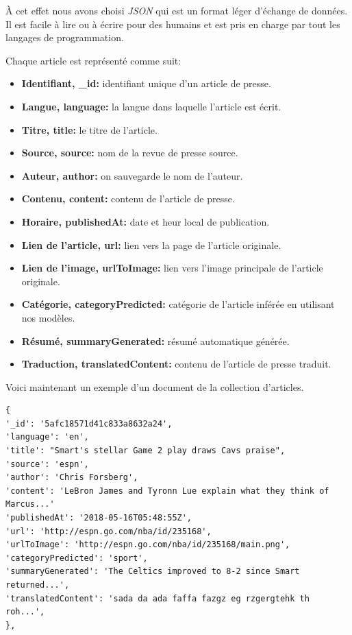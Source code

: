 À cet effet nous avons choisi \emph{JSON} qui est un format léger d'échange de données. Il est facile à lire ou à écrire pour des humains\cite{json} et est pris en charge par tout les langages de programmation.

Chaque article est représenté comme suit:
\begin{itemize}
    \item \textbf{Identifiant, \textquotedbl \_id\textquotedbl: } identifiant unique d'un article de presse.
    \item \textbf{Langue, \textquotedbl language\textquotedbl:} la langue dans laquelle l'article est écrit.
    \item \textbf{Titre, \textquotedbl title\textquotedbl:} le titre de l'article.
    \item \textbf{Source, \textquotedbl source\textquotedbl:} nom de la revue de presse source.
    \item \textbf{Auteur, \textquotedbl author\textquotedbl:} on sauvegarde le nom de l'auteur.
    \item \textbf{Contenu, \textquotedbl content\textquotedbl:} contenu de l'article de presse.
    \item \textbf{Horaire, \textquotedbl publishedAt\textquotedbl:} date et heur local de publication.
    \item \textbf{Lien de l'article, \textquotedbl url\textquotedbl:} lien vers la page de l'article originale.
    \item \textbf{Lien de l'image, \textquotedbl urlToImage\textquotedbl:} lien vers l'image principale de l'article originale.
    \item \textbf{Catégorie, \textquotedbl categoryPredicted\textquotedbl:} catégorie de l'article inférée en utilisant nos modèles.
    \item \textbf{Résumé, \textquotedbl summaryGenerated\textquotedbl:} résumé automatique générée.
    \item \textbf{Traduction, \textquotedbl translatedContent\textquotedbl:} contenu de l'article de presse traduit.\\
\end{itemize}

Voici maintenant un exemple d'un document de la collection d'articles.
\begin{lstlisting}[style=code]
{
'_id': '5afc18571d41c833a8632a24', 
'language': 'en',
'title': "Smart's stellar Game 2 play draws Cavs praise", 
'source': 'espn', 
'author': 'Chris Forsberg', 
'content': 'LeBron James and Tyronn Lue explain what they think of Marcus...'
'publishedAt': '2018-05-16T05:48:55Z', 
'url': 'http://espn.go.com/nba/id/235168',
'urlToImage': 'http://espn.go.com/nba/id/235168/main.png',  
'categoryPredicted': 'sport', 
'summaryGenerated': 'The Celtics improved to 8-2 since Smart returned...', 
'translatedContent': 'sada da ada faffa fazgz eg rzgergtehk th roh...', 
},
\end{lstlisting}

